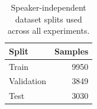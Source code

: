 \begin{table}
\caption{Speaker-independent dataset splits used across all experiments.}
\label{tab:table_1_dataset_splits}
\begin{tabular}{lr}
\toprule
Split & Samples \\
\midrule
Train & 9950 \\
Validation & 3849 \\
Test & 3030 \\
\bottomrule
\end{tabular}
\end{table}
